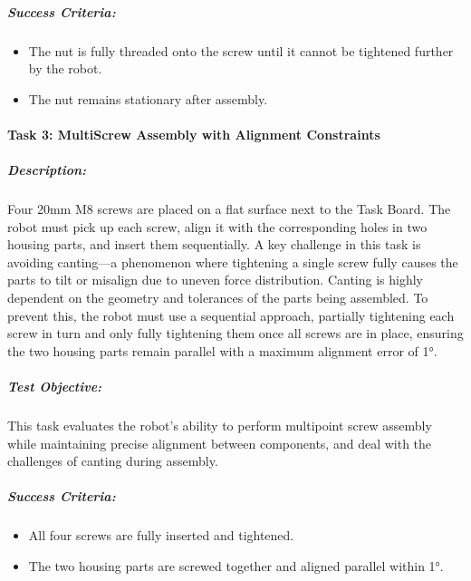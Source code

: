 \documentclass[letterpaper,10pt,english]{sphinxmanual}
\begin{document}
\subparagraph{Success Criteria:}
\label{\detokenize{robotic_instructions_screws_and_nuts:id3}}\begin{itemize}
\item {} 
\sphinxAtStartPar
The nut is fully threaded onto the screw until it cannot be tightened further by the robot.

\item {} 
\sphinxAtStartPar
The nut remains stationary after assembly.

\end{itemize}


\paragraph{Task 3: Multi\sphinxhyphen{}Screw Assembly with Alignment Constraints}
\label{\detokenize{robotic_instructions_screws_and_nuts:task-3-multi-screw-assembly-with-alignment-constraints}}

\subparagraph{Description:}
\label{\detokenize{robotic_instructions_screws_and_nuts:id4}}
\sphinxAtStartPar
Four 20mm M8 screws are placed on a flat surface next to the Task Board.
The robot must pick up each screw, align it with the corresponding holes in two housing parts, and insert them sequentially.
A key challenge in this task is avoiding canting—a phenomenon where tightening a single screw fully causes the parts to tilt or misalign due to uneven force distribution.
Canting is highly dependent on the geometry and tolerances of the parts being assembled.
To prevent this, the robot must use a sequential approach, partially tightening each screw in turn and only fully tightening them once all screws are in place, ensuring the two housing parts remain parallel with a maximum alignment error of 1°.


\subparagraph{Test Objective:}
\label{\detokenize{robotic_instructions_screws_and_nuts:id5}}
\sphinxAtStartPar
This task evaluates the robot’s ability to perform multi\sphinxhyphen{}point screw assembly while maintaining precise alignment between components,
and deal with the challenges of canting during assembly.


\subparagraph{Success Criteria:}
\label{\detokenize{robotic_instructions_screws_and_nuts:id6}}\begin{itemize}
\item {} 
\sphinxAtStartPar
All four screws are fully inserted and tightened.

\item {} 
\sphinxAtStartPar
The two housing parts are screwed together and aligned parallel within 1°.

\end{itemize}
\end{document}
